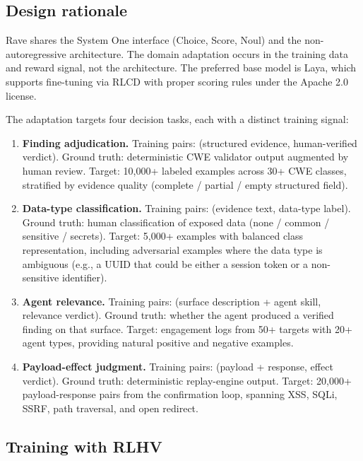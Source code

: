 \documentclass[conference]{IEEEtran}
\begin{document}
\subsection{Design rationale}

Rave shares the System One interface (Choice, Score, Noul) and the non-autoregressive architecture. The domain adaptation occurs in the training data and reward signal, not the architecture. The preferred base model is Laya, which supports fine-tuning via RLCD with proper scoring rules under the Apache 2.0 license.

The adaptation targets four decision tasks, each with a distinct training signal:

\begin{enumerate}[leftmargin=*]
\item \textbf{Finding adjudication.} Training pairs: (structured evidence, human-verified verdict). Ground truth: deterministic CWE validator output augmented by human review. Target: 10,000+ labeled examples across 30+ CWE classes, stratified by evidence quality (complete / partial / empty structured field).

\item \textbf{Data-type classification.} Training pairs: (evidence text, data-type label). Ground truth: human classification of exposed data (none / common / sensitive / secrets). Target: 5,000+ examples with balanced class representation, including adversarial examples where the data type is ambiguous (e.g., a UUID that could be either a session token or a non-sensitive identifier).

\item \textbf{Agent relevance.} Training pairs: (surface description + agent skill, relevance verdict). Ground truth: whether the agent produced a verified finding on that surface. Target: engagement logs from 50+ targets with 20+ agent types, providing natural positive and negative examples.

\item \textbf{Payload-effect judgment.} Training pairs: (payload + response, effect verdict). Ground truth: deterministic replay-engine output. Target: 20,000+ payload-response pairs from the confirmation loop, spanning XSS, SQLi, SSRF, path traversal, and open redirect.
\end{enumerate}

\subsection{Training with RLHV}
\end{document}

